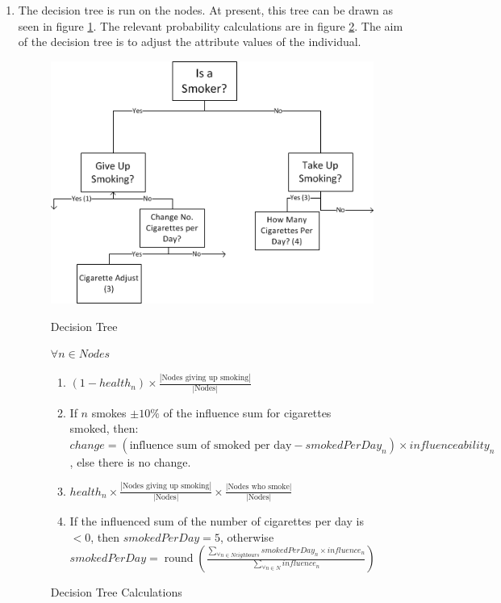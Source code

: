 \documentclass[]{article}
\begin{document}
\begin{enumerate}
\item The decision tree is run on the nodes. At present, this tree can be drawn as seen in figure \ref{dectree}. The relevant probability calculations are in figure \ref{decTreeProbs}. The aim of the decision tree is to adjust the attribute values of the individual.
\begin{figure}[h]
\begin{center}
\includegraphics{DecTreeBasic.png}
\label{dectree}
\caption{Decision Tree}
\end{center}
\end{figure}


\begin{figure}[h]
	$\forall n \in Nodes$
	\begin{enumerate}
		\item $(1-health_{n}) \times \frac{|\text{Nodes giving up smoking}|}{|\text{Nodes}|}$
		\item If $n$ smokes $\pm10\%$ of the influence sum for cigarettes smoked, then: \\
		$change = (\text{influence sum of smoked per day} - {smokedPerDay}_{n}) \times influenceability_{n}$, else there is no change.
		\item $health_{n} \times \frac{|\text{Nodes giving up smoking}|}{|\text{Nodes}|} \times \frac{|\text{Nodes who smoke}|}{|\text{Nodes}|}$
		\item If the influenced sum of the number of cigarettes per day is $< 0$, then $smokedPerDay = 5$, otherwise \\
		
		$smokedPerDay = \operatorname{round}(\frac{\sum_{\forall n \in Neighbours} smokedPerDay_{n} \times influence_{n}}{\sum_{\forall n \in N} influence_{n}})$
	\end{enumerate}
	\label{decTreeProbs}
	\caption{Decision Tree Calculations}
\end{figure}


\end{enumerate}
\end{document}
